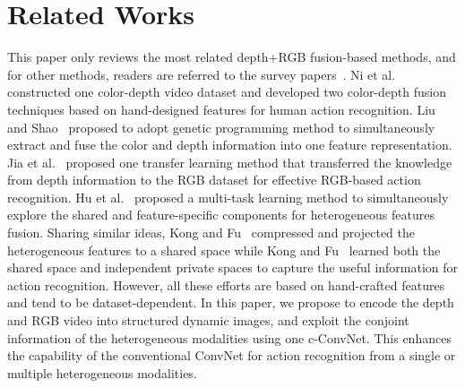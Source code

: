 \documentclass[letterpaper]{article} %
\begin{document}
\section{Related Works}\label{relatedwork}
This paper only reviews the most related depth+RGB fusion-based methods, and for other methods, readers are referred to the survey papers~\cite{aggarwal2014human,presti20163d,zhang2016rgb}. Ni et al.~\cite{ni2011colour} constructed one color-depth video dataset and developed two color-depth fusion techniques based on hand-designed features for human action recognition.  Liu and Shao~\cite{liu2013learning} proposed to adopt genetic programming method to simultaneously extract and fuse the color and depth information into one feature representation. Jia et al.~\cite{jia2014latent} proposed one transfer learning method that transferred the knowledge from depth information to the RGB dataset for effective RGB-based action recognition. Hu et al.~\cite{hu2015jointly} proposed a multi-task learning method to simultaneously explore the shared and
feature-specific components for heterogeneous features fusion. Sharing similar ideas, Kong and Fu~\cite{Kong2015CVPR} compressed and projected the
heterogeneous features to a shared space while Kong and Fu~\cite{kong2017max} learned both the shared space and independent private spaces to capture the useful information for action recognition. However, all these efforts are based on hand-crafted features and tend to be dataset-dependent. In this paper, we propose to encode the depth and RGB video into structured dynamic images, and exploit the conjoint information of the heterogeneous modalities using one c-ConvNet. This enhances the capability of the conventional ConvNet for action recognition from a single or multiple heterogeneous modalities.
\end{document}
